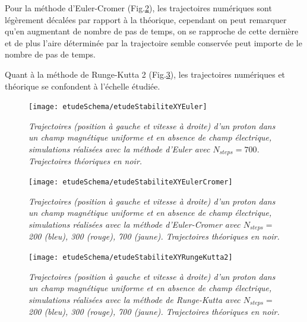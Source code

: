 \documentclass[a4paper,12pt,oneside]{article}
\begin{document}
Pour la méthode d'Euler-Cromer (Fig.\ref{etudeStabiliteXYEulerCromer}), les trajectoires numériques sont légèrement décalées par rapport à la théorique, cependant on peut remarquer qu'en augmentant de nombre de pas de temps, on se rapproche de cette dernière et de plus l'aire déterminée par la trajectoire semble conservée peut importe de le nombre de pas de temps.

Quant à la méthode de Runge-Kutta 2 (Fig.\ref{etudeStabiliteXYRungeKutta2}), les trajectoires numériques et théorique se confondent à l'échelle étudiée.

\begin{figure}[H]
\centerline{\texttt{[image: etudeSchema/etudeStabiliteXYEuler]}}
    \caption{ \label{etudeStabiliteXYEuler}\em
     Trajectoires (position à gauche et vitesse à droite) d'un proton dans un champ magnétique uniforme et en absence de champ électrique, simulations réalisées avec la méthode d'Euler avec $N_{steps}=700$. Trajectoires théoriques en noir.}
\end{figure}

\begin{figure}[H]
   \centerline{
    \texttt{[image: etudeSchema/etudeStabiliteXYEulerCromer]}}
    \caption{ \label{etudeStabiliteXYEulerCromer}\em
 Trajectoires (position à gauche et vitesse à droite) d'un proton dans un champ magnétique uniforme et en absence de champ électrique, simulations réalisées avec la méthode d'Euler-Cromer avec $N_{steps}=$ 200 (bleu), 300 (rouge), 700 (jaune). Trajectoires théoriques en noir.}
\end{figure}

\begin{figure}[H]
    \centerline{\texttt{[image: etudeSchema/etudeStabiliteXYRungeKutta2]}}
\caption{ \label{etudeStabiliteXYRungeKutta2}\em
Trajectoires (position à gauche et vitesse à droite) d'un proton dans un champ magnétique uniforme et en absence de champ électrique, simulations réalisées avec la méthode de Runge-Kutta avec $N_{steps}=$ 200 (bleu), 300 (rouge), 700 (jaune). Trajectoires théoriques en noir.
}
\end{figure}
\end{document}
